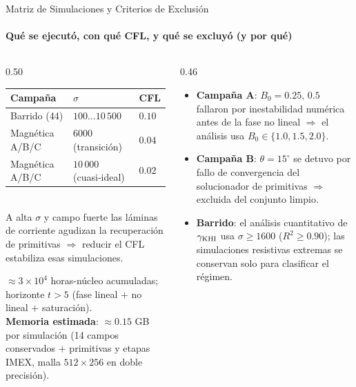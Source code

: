 \documentclass[aspectratio=169,9pt]{beamer}
\begin{document}
\begin{frame}{Matriz de Simulaciones y Criterios de Exclusi\'on}
\framesubtitle{Qu\'e se ejecut\'o, con qu\'e CFL, y qu\'e se excluy\'o (y por qu\'e)}
\begin{columns}[T]
\begin{column}{0.50\textwidth}
  \begin{tcolorbox}[EQ={Matriz $\sigma\times$CFL}]
    \scriptsize
    \begin{tabular}{@{}lll@{}}
      \toprule
      Campa\~na & $\sigma$ & CFL\\
      \midrule
      Barrido (44) & $100\ldots10\,500$ & $0.10$\\
      Magn\'etica A/B/C & $6000$ {\tiny(transici\'on)} & $0.04$\\
      Magn\'etica A/B/C & $10\,000$ {\tiny(cuasi-ideal)} & $0.02$\\
      \bottomrule
    \end{tabular}\\[4pt]
    A alta $\sigma$ y campo fuerte las l\'aminas de corriente agudizan la
    recuperaci\'on de primitivas $\Rightarrow$ reducir el CFL estabiliza
    esas simulaciones.
  \end{tcolorbox}
  \pause\vspace{0.1cm}
  {\scriptsize $\approx3\times10^4$ horas-n\'ucleo acumuladas;
   horizonte $t>5$ (fase lineal $+$ no lineal $+$ saturaci\'on).\\[2pt]
   \textbf{Memoria estimada}: $\approx0.15$ GB por simulaci\'on
   (14 campos conservados $+$ primitivas y etapas IMEX,
   malla $512\times256$ en doble precisi\'on).}
\end{column}
\begin{column}{0.46\textwidth}
  \pause
  \begin{tcolorbox}[WRN={Datos excluidos --- declarados y justificados}]
    \scriptsize
    \begin{itemize}\setlength\itemsep{2pt}
      \item \textbf{Campa\~na A}: $B_0=0.25,\,0.5$ fallaron por
            inestabilidad num\'erica antes de la fase no lineal
            $\Rightarrow$ el an\'alisis usa $B_0\in\{1.0,1.5,2.0\}$.
      \item \textbf{Campa\~na B}: $\theta=15^\circ$ se detuvo por fallo de
            convergencia del solucionador de primitivas
            $\Rightarrow$ excluida del conjunto limpio.
      \item \textbf{Barrido}: el an\'alisis cuantitativo de $\gamma_{\rm KHI}$
            usa $\sigma\ge1600$ ($R^2\ge0.90$); las simulaciones resistivas
            extremas se conservan solo para clasificar el r\'egimen.
    \end{itemize}
  \end{tcolorbox}
\end{column}
\end{columns}
\end{frame}
\end{document}
